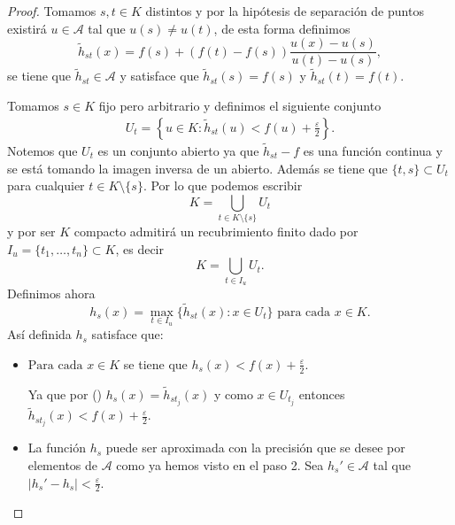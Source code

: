 \begin{proof}
    Tomamos $s,t \in K$ distintos y por la hipótesis de separación de puntos existirá $u \in \mathcal{A}$ tal que $u(s) \neq u(t)$, de esta forma definimos 
    \begin{equation}
        \tilde{h}_{s t}(x) = 
            f(s) + (f(t) - f(s))\frac{ u(x) - u(s)}{ u(t) - u(s)}, 
    \end{equation}
    se tiene que  $\tilde{h}_{s t} \in \mathcal{A}$
    y satisface que 
    $\tilde{h}_{s t}(s) = f(s)$ y $\tilde{h}_{s t}(t) = f(t)$. 
    
    Tomamos $s \in K$ fijo pero arbitrario y 
    definimos el siguiente conjunto 
    \begin{align}
        U_t = 
        \left\{
            u \in K \colon
            \tilde{h}_{s t}(u) < f(u) + \frac{\varepsilon}{2}
        \right\}.
    \end{align}
    Notemos que $U_t$ es un conjunto abierto ya que 
    $\tilde{h}_{s t} - f$ es una función continua
    y se está tomando la imagen inversa de un abierto. 
    Además se tiene que $\{t,s\} \subset U_t$ para cualquier
    $t \in K \setminus \{s\}$. 
    Por lo que podemos escribir 
    \begin{equation*}
        K = \bigcup_{t \in K \setminus \{s\}} U_t
    \end{equation*}
    y por ser $K$ compacto admitirá un recubrimiento finito dado por 
    $I_u = \{t_1, \ldots, t_n\} \subset K$, es decir 
    \begin{equation}\label{subrecubrimiento_t}
        K = \bigcup_{t \in I_u} U_t.
    \end{equation}
    Definimos ahora 
    \begin{equation*}
        h_s(x) = \max_{t \in I_u}\{ 
            \tilde{h}_{s t}(x) 
            \colon
            x \in U_t
        \} 
        \text{ para cada } x \in K. 
    \end{equation*}
    Así definida $h_s$ satisface que: 
    \begin{itemize}
        \item $\text{Para cada } x \in K$ se tiene que $h_s(x) < f(x) + \frac{\varepsilon}{2}$.
        
        Ya que por 
        () 
        $h_s(x) =  \tilde{h}_{s t_j}(x)$ y 
        como $x \in U_{t_j}$ entonces 
        $\tilde{h}_{s t_j}(x) < f(x) + \frac{\varepsilon}{2}$.
        \item La función $h_s$ puede ser aproximada con la precisión que se desee por elementos de $\mathcal{A}$ como ya hemos visto en el paso 2.
        Sea $h_s'\in \mathcal{A}$ tal que 
        $|h_s' - h_s| < \frac{\varepsilon}{2}$.


\end{itemize}
\end{proof}
